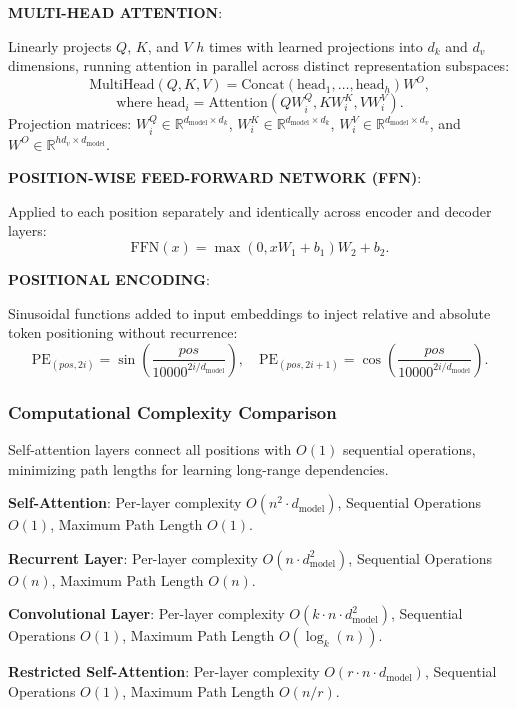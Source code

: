 \begin{dashlist}
    \item \textbf{MULTI-HEAD ATTENTION}:
    
    Linearly projects $Q$, $K$, and $V$ $h$ times with learned projections into $d_k$ and $d_v$ dimensions, running attention in parallel across distinct representation subspaces:
    \[
    \text{MultiHead}(Q, K, V) = \text{Concat}(\text{head}_1, \dots, \text{head}_h) W^O ,
    \]
    \[
    \text{where } \text{head}_i = \text{Attention}(Q W_i^Q, K W_i^K, V W_i^V) .
    \]
    Projection matrices: $W_i^Q \in \mathbb{R}^{d_{\text{model}} \times d_k}$, $W_i^K \in \mathbb{R}^{d_{\text{model}} \times d_k}$, $W_i^V \in \mathbb{R}^{d_{\text{model}} \times d_v}$, and $W^O \in \mathbb{R}^{h d_v \times d_{\text{model}}}$.

    \item \textbf{POSITION-WISE FEED-FORWARD NETWORK (FFN)}:
    
    Applied to each position separately and identically across encoder and decoder layers:
    \[
    \text{FFN}(x) = \max(0, x W_1 + b_1) W_2 + b_2 .
    \]

    \item \textbf{POSITIONAL ENCODING}: 
    
    Sinusoidal functions added to input embeddings to inject relative and absolute token positioning without recurrence:
    \[
    \text{PE}_{(pos, 2i)} = \sin\left(\frac{pos}{10000^{2i / d_{\text{model}}}}\right), \quad \text{PE}_{(pos, 2i+1)} = \cos\left(\frac{pos}{10000^{2i / d_{\text{model}}}}\right) .
    \]
\end{dashlist}

\subsubsection{Computational Complexity Comparison}
Self-attention layers connect all positions with $O(1)$ sequential operations, minimizing path lengths for learning long-range dependencies.

\begin{dashlist}
    \item \textbf{Self-Attention}: Per-layer complexity $O(n^2 \cdot d_{\text{model}})$, Sequential Operations $O(1)$, Maximum Path Length $O(1)$.
    \item \textbf{Recurrent Layer}: Per-layer complexity $O(n \cdot d_{\text{model}}^2)$, Sequential Operations $O(n)$, Maximum Path Length $O(n)$.
    \item \textbf{Convolutional Layer}: Per-layer complexity $O(k \cdot n \cdot d_{\text{model}}^2)$, Sequential Operations $O(1)$, Maximum Path Length $O(\log_k(n))$.
    \item \textbf{Restricted Self-Attention}: Per-layer complexity $O(r \cdot n \cdot d_{\text{model}})$, Sequential Operations $O(1)$, Maximum Path Length $O(n/r)$.
\end{dashlist}

